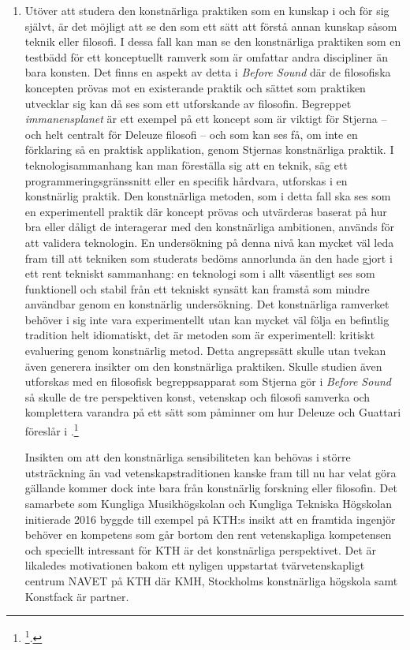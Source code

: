 \documentclass[11pt]{article}
\begin{document}
\begin{enumerate}
\item Utöver att studera den konstnärliga praktiken som en kunskap i och
för sig självt, är det möjligt att se den som ett sätt att förstå
annan kunskap såsom teknik eller filosofi. I dessa fall kan man se
den konstnärliga praktiken som en testbädd för ett konceptuellt
ramverk som är omfattar andra discipliner än bara konsten. Det finns
en aspekt av detta i \emph{Before Sound} där de filosofiska koncepten
prövas mot en existerande praktik och sättet som praktiken utvecklar
sig kan då ses som ett utforskande av filosofin. Begreppet
\emph{immanensplanet} är ett exempel på ett koncept som är viktigt för
Stjerna -- och helt centralt för Deleuze filosofi -- och som kan ses
få, om inte en förklaring så en praktisk applikation, genom Stjernas
konstnärliga praktik. I teknologisammanhang kan man föreställa sig
att en teknik, säg ett programmeringsgränssnitt eller en specifik
hårdvara, utforskas i en konstnärlig praktik. Den konstnärliga
metoden, som i detta fall ska ses som en experimentell praktik där
koncept prövas och utvärderas baserat på hur bra eller dåligt de
interagerar med den konstnärliga ambitionen, används för att validera
teknologin. En undersökning på denna nivå kan mycket väl leda fram
till att tekniken som studerats bedöms annorlunda än den hade gjort i
ett rent tekniskt sammanhang: en teknologi som i allt väsentligt ses
som funktionell och stabil från ett tekniskt synsätt kan framstå som
mindre användbar genom en konstnärlig undersökning. Det konstnärliga
ramverket behöver i sig inte vara experimentellt utan kan mycket väl
följa en befintlig tradition helt idiomatiskt, det är metoden som är
experimentell: kritiskt evaluering genom konstnärlig metod. Detta
angrepssätt skulle utan tvekan även generera insikter om den
konstnärliga praktiken. Skulle studien även utforskas med en
filosofisk begreppsapparat som Stjerna gör i \emph{Before Sound} så skulle
de tre perspektiven konst, vetenskap och filosofi samverka och
komplettera varandra på ett sätt som påminner om hur Deleuze och
Guattari föreslår i .\footnote{\footcite{deleuze1994}.}

Insikten om att den konstnärliga sensibiliteten kan behövas i större
utsträckning än vad vetenskapstraditionen kanske fram till nu har
velat göra gällande kommer dock inte bara från konstnärlig forskning
eller filosofin. Det samarbete som Kungliga Musikhögskolan och
Kungliga Tekniska Högskolan initierade 2016 byggde till exempel på
KTH:s insikt att en framtida ingenjör behöver en kompetens som går
bortom den rent vetenskapliga kompetensen och speciellt intressant
för KTH är det konstnärliga perspektivet. Det är likaledes
motivationen bakom ett nyligen uppstartat tvärvetenskapligt centrum
NAVET på KTH där KMH, Stockholms konstnärliga högskola samt Konstfack
är partner.


\end{enumerate}
\end{document}
